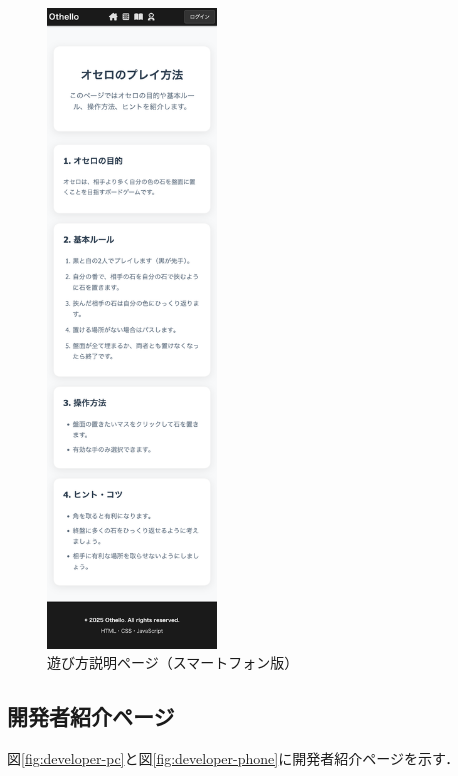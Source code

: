 \documentclass[10pt, a4paper]{jsarticle}
\begin{document}
\begin{figure}[H]
\centering
\includegraphics[width=0.4\textwidth]{img/howto-phone.png}
\caption{遊び方説明ページ（スマートフォン版）}
\label{fig:howto-phone}
\end{figure}

\subsection{開発者紹介ページ}
図\ref{fig:developer-pc}と図\ref{fig:developer-phone}に開発者紹介ページを示す．
\end{document}
